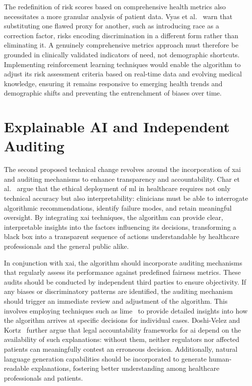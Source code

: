 \documentclass[11pt,showkeys]{essay}
\begin{document}
The redefinition of risk scores based on comprehensive health metrics also necessitates a more granular analysis of patient data. Vyas et al.~\cite{vyas_hidden_2020} warn that substituting one flawed proxy for another, such as introducing race as a correction factor, risks encoding discrimination in a different form rather than eliminating it. A genuinely comprehensive metrics approach must therefore be grounded in clinically validated indicators of need, not demographic shortcuts. Implementing reinforcement learning techniques would enable the algorithm to adjust its risk assessment criteria based on real-time data and evolving medical knowledge, ensuring it remains responsive to emerging health trends and demographic shifts and preventing the entrenchment of biases over time.

\section{Explainable AI and Independent Auditing}

The second proposed technical change revolves around the incorporation of \gls{xai} and auditing mechanisms to enhance transparency and accountability. Char et al.~\cite{char_implementing_2018} argue that the ethical deployment of \gls{ml} in healthcare requires not only technical accuracy but also interpretability: clinicians must be able to interrogate algorithmic recommendations, identify failure modes, and retain meaningful oversight. By integrating \gls{xai} techniques, the algorithm can provide clear, interpretable insights into the factors influencing its decisions, transforming a black box into a transparent sequence of actions understandable by healthcare professionals and the general public alike.

In conjunction with \gls{xai}, the algorithm should incorporate auditing mechanisms that regularly assess its performance against predefined fairness metrics. These audits should be conducted by independent third parties to ensure objectivity. If any biases or discriminatory patterns are identified, the auditing mechanism should trigger an immediate review and adjustment of the algorithm. This involves employing techniques such as \gls{lime}~\cite{ribeiro_why_2016} to provide detailed insights into how the algorithm arrives at specific decisions for individual cases. Doshi-Velez and Kortz~\cite{doshivelez_accountability_2017} further argue that legal accountability frameworks for \gls{ai} depend on the availability of such explanations: without them, neither regulators nor affected patients can meaningfully contest an erroneous decision. Additionally, natural language generation capabilities should be incorporated to generate human-readable explanations, fostering better understanding among healthcare professionals and patients.
\end{document}
